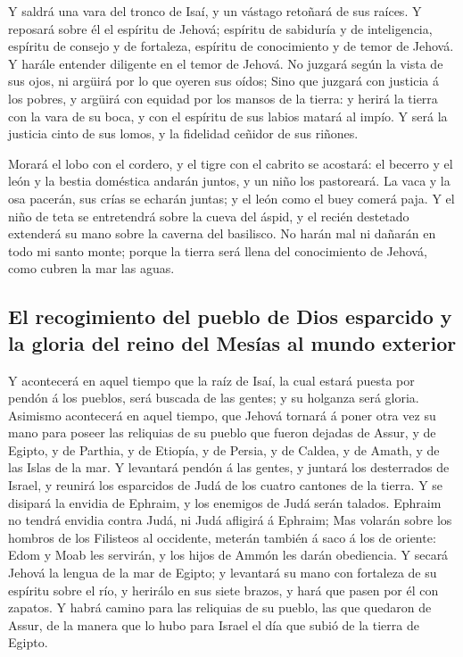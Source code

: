  Y saldrá una vara del tronco de Isaí, y un vástago retoñará
de sus raíces.  Y reposará sobre él el espíritu de Jehová;
espíritu de sabiduría y de inteligencia, espíritu de consejo y de
fortaleza, espíritu de conocimiento y de temor de Jehová.  Y
harále entender diligente en el temor de Jehová. No juzgará según la
vista de sus ojos, ni argüirá por lo que oyeren sus oídos; 
Sino que juzgará con justicia á los pobres, y argüirá con equidad por
los mansos de la tierra: y herirá la tierra con la vara de su boca, y
con el espíritu de sus labios matará al impío.  Y será la
justicia cinto de sus lomos, y la fidelidad ceñidor de sus riñones.

 Morará el lobo con el cordero, y el tigre con el cabrito se
acostará: el becerro y el león y la bestia doméstica andarán juntos, y
un niño los pastoreará.  La vaca y la osa pacerán, sus crías
se echarán juntas; y el león como el buey comerá paja.  Y el
niño de teta se entretendrá sobre la cueva del áspid, y el recién
destetado extenderá su mano sobre la caverna del basilisco. 
No harán mal ni dañarán en todo mi santo monte; porque la tierra será
llena del conocimiento de Jehová, como cubren la mar las aguas.

\hypertarget{el-recogimiento-del-pueblo-de-dios-esparcido-y-la-gloria-del-reino-del-mesuxedas-al-mundo-exterior}{%
\subsection{El recogimiento del pueblo de Dios esparcido y la gloria del
reino del Mesías al mundo
exterior}\label{el-recogimiento-del-pueblo-de-dios-esparcido-y-la-gloria-del-reino-del-mesuxedas-al-mundo-exterior}}

 Y acontecerá en aquel tiempo que la raíz de Isaí, la cual
estará puesta por pendón á los pueblos, será buscada de las gentes; y su
holganza será gloria.  Asimismo acontecerá en aquel tiempo,
que Jehová tornará á poner otra vez su mano para poseer las reliquias de
su pueblo que fueron dejadas de Assur, y de Egipto, y de Parthia, y de
Etiopía, y de Persia, y de Caldea, y de Amath, y de las Islas de la mar.
 Y levantará pendón á las gentes, y juntará los desterrados
de Israel, y reunirá los esparcidos de Judá de los cuatro cantones de la
tierra.  Y se disipará la envidia de Ephraim, y los
enemigos de Judá serán talados. Ephraim no tendrá envidia contra Judá,
ni Judá afligirá á Ephraim;  Mas volarán sobre los hombros
de los Filisteos al occidente, meterán también á saco á los de oriente:
Edom y Moab les servirán, y los hijos de Ammón les darán obediencia.
 Y secará Jehová la lengua de la mar de Egipto; y levantará
su mano con fortaleza de su espíritu sobre el río, y herirálo en sus
siete brazos, y hará que pasen por él con zapatos.  Y habrá
camino para las reliquias de su pueblo, las que quedaron de Assur, de la
manera que lo hubo para Israel el día que subió de la tierra de Egipto.

